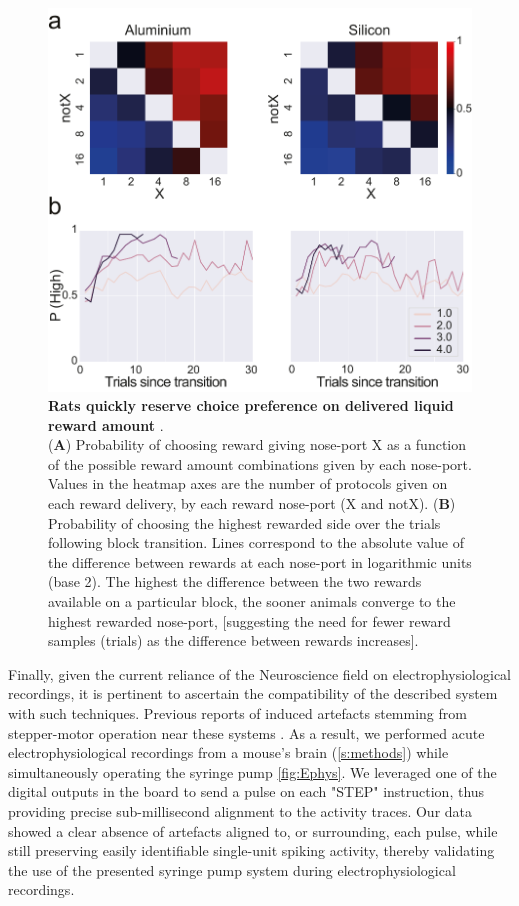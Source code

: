 \begin{figure}[ht] 
	\centering
	\includegraphics[width=1.0\linewidth]{Figures/Artboard 9.pdf}
	\caption{\textbf{Rats quickly reserve choice preference on delivered liquid reward amount }.\\
		(\textbf{A}) Probability of choosing reward giving nose-port X as a function of the possible reward amount combinations given by each nose-port. Values in the heatmap axes are the number of protocols given on each reward delivery, by each reward nose-port (X and notX). (\textbf{B}) Probability of choosing the highest rewarded side over the trials following block transition. Lines correspond to the absolute value of the difference between rewards at each nose-port in logarithmic units (base 2). The highest the difference between the two rewards available on a particular block, the sooner animals converge to the highest rewarded nose-port, [suggesting the need for fewer reward samples (trials) as the difference between rewards increases]. }
	\label{fig:Behavior} 
\end{figure}

Finally, given the current reliance of the Neuroscience field on electrophysiological recordings, it is pertinent to ascertain the compatibility of the described system with such techniques. Previous reports of induced artefacts stemming from stepper-motor operation near these systems \citep{Amarante2019}. As a result, we performed acute electrophysiological recordings from a mouse's brain (\ref{s:methods}) while simultaneously operating the syringe pump \ref{fig:Ephys}. 
We leveraged one of the digital outputs in the board to send a pulse on each "STEP" instruction, thus providing precise sub-millisecond alignment to the activity traces. 
Our data showed a clear absence of artefacts aligned to, or surrounding, each pulse, while still preserving easily identifiable single-unit spiking activity, thereby validating the use of the presented syringe pump system during electrophysiological recordings.

